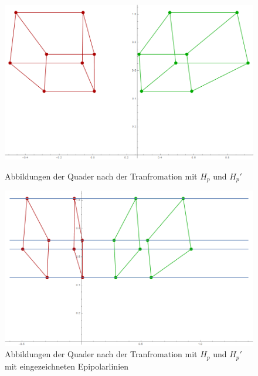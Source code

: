 
\begin{figure}[!htb]
	\includegraphics[width=\linewidth]{images/Rectification_Hp_same_Solutions.png}
	\caption[$H_p$ und $H_p'$ Transformation]{Abbildungen der Quader nach der Tranfromation mit $H_p$ und $H_p'$}
	\label{fig:RectSameHp1}
	\endminipage\hfill
	\includegraphics[width=\linewidth]{images/Rectification_Hp_same_Solutions_Lines.png}
	\caption[$H_p$ und $H_p'$ Transformation mit Epipolarlinien]{Abbildungen der Quader nach der Tranfromation mit $H_p$ und $H_p'$ mit eingezeichneten Epipolarlinien}
	\label{fig:RectSameHp2}
	\endminipage\hfill
\end{figure}

